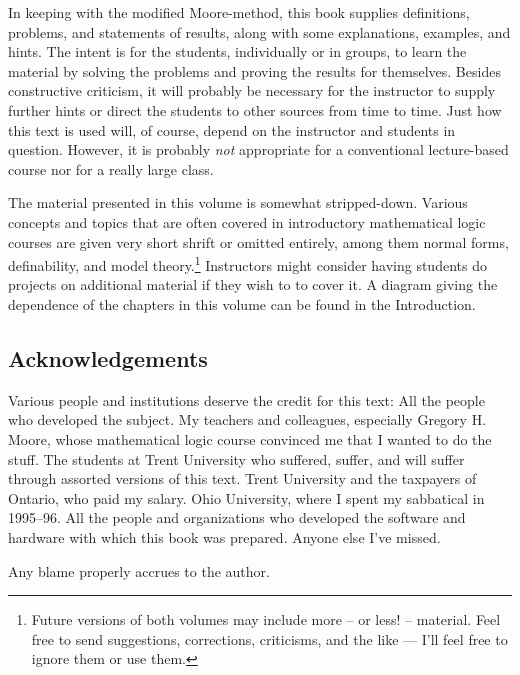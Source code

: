 \documentclass[12pt]{amsbook}
\theoremstyle{plain}
\theoremstyle{definition}
\theoremstyle{remark}
\begin{document}
In keeping with the modified Moore-method,  this book supplies definitions,  problems,  and statements of results,  along with some explanations,  examples,  and hints.  The intent is for the students,  individually or in groups,  to learn the material by solving the problems and proving the results for themselves.  Besides constructive criticism,  it will probably be necessary for the instructor to supply further hints or direct the students to other sources from time to time.  Just how this text is used will,  of course,  depend on the instructor and students in question.  However,  it is probably {\em not\/} appropriate for a conventional lecture-based course nor for a really large class.

The material presented in this volume is somewhat stripped-down.  Various concepts and topics that are often covered in introductory mathematical logic courses are given very short shrift or omitted entirely,  among them normal forms,  definability,  and model theory.\footnote{Future versions of both volumes may include more -- or less! -- material.  Feel free to send suggestions,  corrections,  criticisms,  and the like --- I'll feel free to ignore them or use them.}  Instructors might consider having students do projects on additional material if they wish to to cover it.  A diagram giving the dependence of the chapters in this volume can be found in the Introduction.


\subsection*{Acknowledgements}
Various people and institutions deserve the credit for this text:  All the people who developed the subject.  My teachers and colleagues,  especially Gregory H. Moore,  whose mathematical logic course convinced me that I wanted to do the stuff.  The students at Trent University who suffered,  suffer,  and will suffer through assorted versions of this text.  Trent University and the taxpayers of Ontario,  who paid my salary.  Ohio University,  where I spent my sabbatical in 1995--96.  All the people and organizations who developed the software and hardware with which this book was prepared.  Anyone else I've missed.

Any blame properly accrues to the author.
\end{document}
